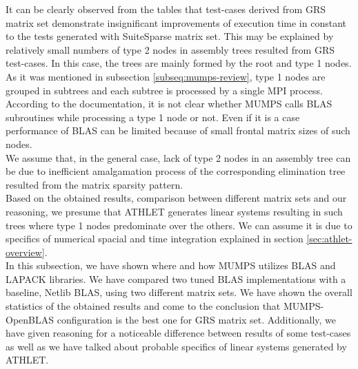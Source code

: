 It can be clearly observed from the tables that test-cases derived from GRS matrix set demonstrate insignificant improvements of execution time in constant to the tests generated with SuiteSparse matrix set. This may be explained by relatively small numbers of type 2 nodes in assembly trees resulted from GRS test-cases. In this case, the trees are mainly formed by the root and type 1 nodes. As it was mentioned in subsection \ref{subseq:mumps-review}, type 1 nodes are grouped in subtrees and each subtree is processed by a single MPI process. According to the documentation, it is not clear whether MUMPS calls BLAS subroutines while processing a type 1 node or not. Even if it is a case performance of BLAS can be limited because of small frontal matrix sizes of such nodes.\\

We assume that, in the general case, lack of type 2 nodes in an assembly tree can be due to inefficient amalgamation process of the corresponding elimination tree resulted from the matrix sparsity pattern.\\


Based on the obtained results, comparison between different matrix sets and our reasoning, we presume that ATHLET generates linear systems resulting in such trees where type 1 nodes predominate over the others. We can assume it is due to specifics of numerical spacial and time integration explained in section \ref{sec:athlet-overview}.\\


In this subsection, we have shown where and how MUMPS utilizes BLAS and LAPACK libraries. We have compared two tuned BLAS implementations with a baseline, Netlib BLAS, using two different matrix sets. We have shown the overall statistics of the obtained results and come to the conclusion that MUMPS-OpenBLAS configuration is the best one for GRS matrix set. Additionally, we have given reasoning for a noticeable difference between results of some test-cases as well as we have talked about probable specifics of linear systems generated by ATHLET.\\
